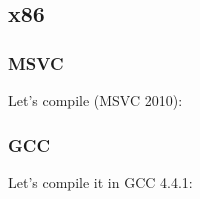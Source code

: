 \subsection{x86}

\subsubsection{MSVC}

Let's compile (MSVC 2010):





\subsubsection{GCC}

Let's compile it in GCC 4.4.1:



